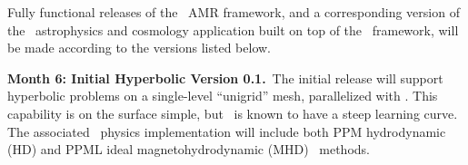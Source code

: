 \documentclass[11pt,letterpaper]{article}
\begin{document}
Fully functional releases of the \cello\ AMR framework, and a
corresponding version of the \enzoii\ astrophysics and cosmology
application built on top of the \cello\ framework, will be made
according to the versions listed below.

   

\textbf{Month 6: Initial Hyperbolic Version 0.1.}~The
initial release will support hyperbolic problems on a single-level
``unigrid'' mesh, parallelized with \charm.  This capability is on the
surface simple, but \charm\ is known to have a steep learning curve.
The associated \enzoii\ physics implementation will include both PPM
hydrodynamic (HD) and PPML ideal magnetohydrodynamic
(MHD)~\cite{UsPo09} methods.
\end{document}
